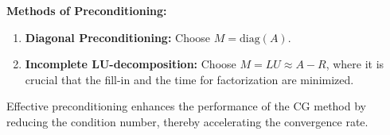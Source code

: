 \documentclass[unicode,11pt,a4paper,oneside,numbers=endperiod,openany]{scrartcl}
\begin{document}
\textbf{Methods of Preconditioning:}
\begin{enumerate}
    \item \textbf{Diagonal Preconditioning:} Choose \( M = \text{diag}(A) \).
    \item \textbf{Incomplete LU-decomposition:} Choose \( M = LU \approx A - R \), where it is crucial that the fill-in and the time for factorization are minimized.
\end{enumerate}

Effective preconditioning enhances the performance of the CG method by reducing the condition number, thereby accelerating the convergence rate.


%
\end{document}
